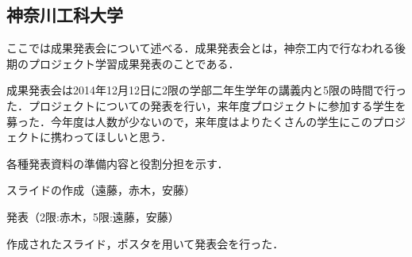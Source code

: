 \subsection{神奈川工科大学} 
\par ここでは成果発表会について述べる．成果発表会とは，神奈工内で行なわれる後期のプロジェクト学習成果発表のことである．
\par 成果発表会は2014年12月12日に2限の学部二年生学年の講義内と5限の時間で行った．プロジェクトについての発表を行い，来年度プロジェクトに参加する学生を募った．今年度は人数が少ないので，来年度はよりたくさんの学生にこのプロジェクトに携わってほしいと思う．
\par 各種発表資料の準備内容と役割分担を示す．
\par スライドの作成（遠藤，赤木，安藤）
\par 発表（2限:赤木，5限:遠藤，安藤）
\par 作成されたスライド，ポスタを用いて発表会を行った．
